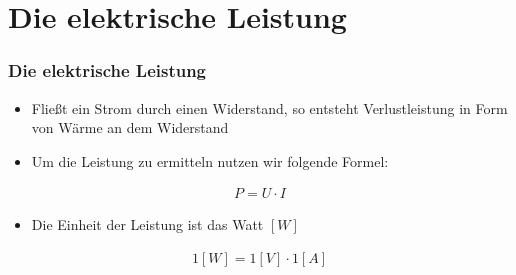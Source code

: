 
\section{Die elektrische Leistung}
\begin{frame}
  \frametitle{Die elektrische Leistung}
  \begin{itemize}
    \item Fließt ein Strom durch einen Widerstand, so entsteht Verlustleistung in Form von Wärme an dem Widerstand
    \item Um die Leistung zu ermitteln nutzen wir folgende Formel:
  \end{itemize}
  \begin{align}
    P = U \cdot I
  \end{align}
  \begin{itemize}
    \item Die Einheit der Leistung ist das Watt $[W]$
  \end{itemize}
  \begin{align}
    1[W] = 1[V] \cdot 1[A]
  \end{align}
\end{frame}

